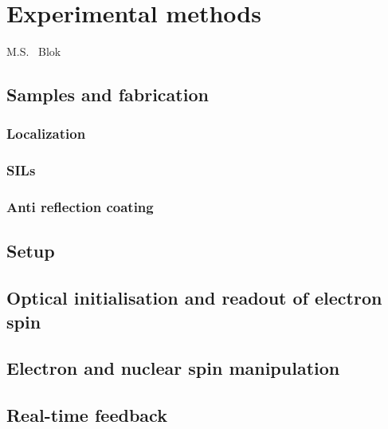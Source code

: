 \graphicspath{{./ch_theory/figures/}}

\chapter{Experimental methods}
\label{ch:experimental}

\begin{center} 
    \vspace{-1cm} {M.S. ~Blok} 
\end{center}
\section{Samples and fabrication}
\subsection{Localization}
\subsection{SILs}
\subsection{Anti reflection coating}

\section{Setup}

\section{Optical initialisation and readout of electron spin}

\section{Electron and nuclear spin manipulation}

\section{Real-time feedback}



\clearpage



